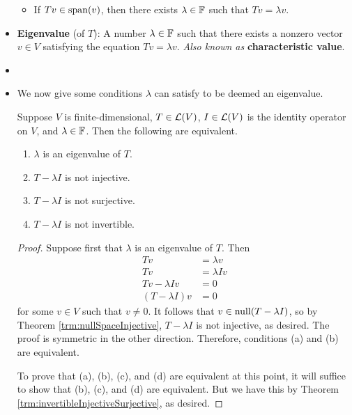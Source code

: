 \documentclass[../main.tex]{subfiles}
\begin{document}
\begin{itemize}
\begin{itemize}
        \item If $Tv\in\operatorname{span}(v)$, then there exists $\lambda\in\mathbb{F}$ such that $Tv=\lambda v$.
    \end{itemize}
    \item \textbf{Eigenvalue} (of $T$): A number $\lambda\in\mathbb{F}$ such that there exists a nonzero vector $v\in V$ satisfying the equation $Tv=\lambda v$. \emph{Also known as} \textbf{characteristic value}.
    \item {}
    \item We now give some conditions $\lambda$ can satisfy to be deemed an eigenvalue.
    \begin{theorem}\label{trm:eigenConditions}
        Suppose $V$ is finite-dimensional, $T\in\mathcal{L}(V)$, $I\in\mathcal{L}(V)$ is the identity operator on $V$, and $\lambda\in\mathbb{F}$. Then the following are equivalent.
        \begin{enumerate}[label={\textup{(}\alph*\textup{)}}]
            \item $\lambda$ is an eigenvalue of $T$.
            \item $T-\lambda I$ is not injective.
            \item $T-\lambda I$ is not surjective.
            \item $T-\lambda I$ is not invertible.
        \end{enumerate}
        \begin{proof}
            Suppose first that $\lambda$ is an eigenvalue of $T$. Then
            \begin{align*}
                Tv &= \lambda v\\
                Tv &= \lambda Iv\\
                Tv-\lambda Iv &= 0\\
                (T-\lambda I)v &= 0
            \end{align*}
            for some $v\in V$ such that $v\neq 0$. It follows that $v\in\operatorname{null}(T-\lambda I)$, so by Theorem \ref{trm:nullSpaceInjective}, $T-\lambda I$ is not injective, as desired. The proof is symmetric in the other direction. Therefore, conditions (a) and (b) are equivalent.\par
            To prove that (a), (b), (c), and (d) are equivalent at this point, it will suffice to show that (b), (c), and (d) are equivalent. But we have this by Theorem \ref{trm:invertibleInjectiveSurjective}, as desired.
        \end{proof}

\end{theorem}
\end{itemize}
\end{document}
